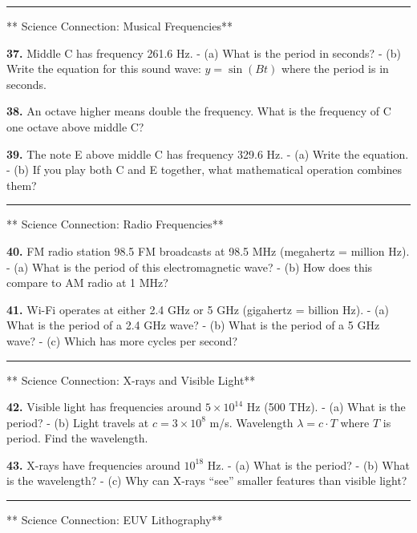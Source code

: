 \documentclass[
  11pt,
]{article}
\begin{document}
\begin{center}\rule{0.5\linewidth}{0.5pt}\end{center}

** Science Connection: Musical Frequencies**

\textbf{37.} Middle C has frequency 261.6 Hz. - (a) What is the period
in seconds? - (b) Write the equation for this sound wave:
\(y = \sin(Bt)\) where the period is in seconds.

\textbf{38.} An octave higher means double the frequency. What is the
frequency of C one octave above middle C?

\textbf{39.} The note E above middle C has frequency 329.6 Hz. - (a)
Write the equation. - (b) If you play both C and E together, what
mathematical operation combines them?

\begin{center}\rule{0.5\linewidth}{0.5pt}\end{center}

** Science Connection: Radio Frequencies**

\textbf{40.} FM radio station 98.5 FM broadcasts at 98.5 MHz (megahertz
= million Hz). - (a) What is the period of this electromagnetic wave? -
(b) How does this compare to AM radio at 1 MHz?

\textbf{41.} Wi-Fi operates at either 2.4 GHz or 5 GHz (gigahertz =
billion Hz). - (a) What is the period of a 2.4 GHz wave? - (b) What is
the period of a 5 GHz wave? - (c) Which has more cycles per second?

\begin{center}\rule{0.5\linewidth}{0.5pt}\end{center}

** Science Connection: X-rays and Visible Light**

\textbf{42.} Visible light has frequencies around \(5 \times 10^{14}\)
Hz (500 THz). - (a) What is the period? - (b) Light travels at
\(c = 3 \times 10^8\) m/s. Wavelength \(\lambda = c \cdot T\) where
\(T\) is period. Find the wavelength.

\textbf{43.} X-rays have frequencies around \(10^{18}\) Hz. - (a) What
is the period? - (b) What is the wavelength? - (c) Why can X-rays
``see'' smaller features than visible light?

\begin{center}\rule{0.5\linewidth}{0.5pt}\end{center}

** Science Connection: EUV Lithography**
\end{document}
